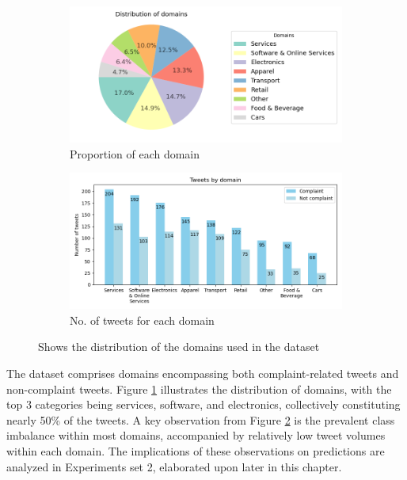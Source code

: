 \begin{figure}[htbp]
    \centering
    \captionsetup{font=small}
    \begin{subfigure}{0.49\textwidth}
        \centering
        \includegraphics[width=\linewidth]{figures/domain_dist.png}
        \caption{Proportion of each domain}
        \label{fig: domain_dist_pct}
    \end{subfigure}
    \hfill
    \begin{subfigure}{0.49\textwidth}
        \centering
        \includegraphics[width=\linewidth]{figures/domain_counts_bar_norandom.png}
        \caption{No. of tweets for each domain}
        \label{fig: domain_dist_count}
    \end{subfigure}
    \caption{Shows the distribution of the domains used in the dataset}
    \label{fig: compl_main_dist}
\end{figure}

The dataset comprises domains encompassing both complaint-related tweets and non-complaint tweets. Figure \ref{fig: domain_dist_pct} illustrates the distribution of domains, with the top 3 categories being services, software, and electronics, collectively constituting nearly 50\% of the tweets. A key observation from Figure \ref{fig: domain_dist_count} is the prevalent class imbalance within most domains, accompanied by relatively low tweet volumes within each domain. The implications of these observations on predictions are analyzed in Experiments set 2, elaborated upon later in this chapter. 

